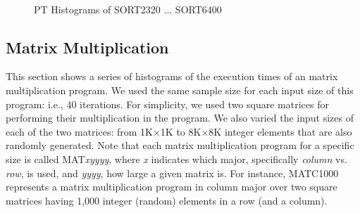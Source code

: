 \documentclass[10pt]{article}
\begin{document}
\begin{figure}[h]
{		\label{fig:sort3200_dist}
	}
	\\
	\caption{PT Histograms of SORT2320 ... SORT6400~\label{fig:sort3}}
\end{figure}

\subsection{Matrix Multiplication~\label{sec:mm}} 

This section shows a series of histograms of 
the execution times of an matrix multiplication program. 
We used the same sample size for each input size of this program: i.e., 40 iterations. 
For simplicity, we used two square matrices for performing their multiplication in the program.  
We also varied the input sizes of each of the two matrices: 
from 1K$\times$1K to 8K$\times$8K integer elements that are also randomly generated. 
Note that each matrix multiplication program for a specific size is called MAT{\it xyyyy}, 
where {\it x} indicates which major, specifically {\em column} vs. {\em row}, is used, and {\it yyyy}, how large a given matrix is. 
For instance, MATC1000 represents a matrix multiplication program 
in column major over two square matrices having 1,000 integer (random) 
elements in a row (and a column). 
\end{document}
